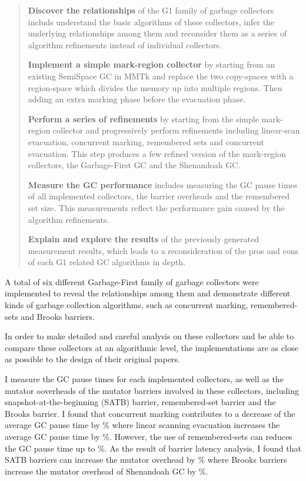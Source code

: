 \begin{quote}
  \textbf{Discover the relationships}
    of the G1 family of garbage collectors includs understand the basic algorithms
    of these collectors, infer the underlying relationships among them and reconsider them as
    a series of algorithm refinements instead of individual collectors.

  \textbf{Implement a simple mark-region collector}
    by starting from an existing SemiSpace GC in MMTk and replace the two copy-spaces
    with a region-space which divides the memory up into multiple regions.
    Then adding an extra marking phase before the evacuation phase.

  \textbf{Perform a series of refinements}
    by starting from the simple mark-region collector and progressively perform
    refinements including linear-scan evacuation, concurrent marking, remembered sets
    and concurrent evacuation. This step produces a few refined version of the
    mark-region collectors, the Garbage-First GC and the Shenandoah GC.

  \textbf{Measure the GC performance}
    includes measuring the GC pause times of all implemented collectors, the 
    barrier overheads and the remembered set size. This measurements reflect the
    performance gain caused by the algorithm refinements.

  \textbf{Explain and explore the results}
    of the previously generated measurement results, which leads to a reconsideration
    of the pros and cons of each G1 related GC algorithms in depth.
\end{quote}

A total of six different Garbage-First family of garbage collectors were implemented to reveal
the relationships among them and demonstrate different kinds of garbage collection
algorithms, such as concurrent marking, remembered-sets and Brooks barriers.

In order to make detailed and careful analysis on these collectors and
be able to compare these collectors at an algorithmic level, the implementations
are as close as possible to the design of their original papers.

I measure the GC pause times for each implemented collectors, as well as the mutator
ooverheads of the mutator barriers involved in these collectors, including
snapshot-at-the-beginning (SATB) barrier, remembered-set barrier and the Brooks barrier.
I found that concurrent marking contributes to a decrease of the average GC pause time by \%
where linear scanning evacuation increases the average GC pause time by \%.
However, the use of remembered-sets can reduces the GC pause time up to \%.
As the result of barrier latency analysis, I found that SATB barriers can
increase the mutator overhead by \% where Brooks barriers
increase the mutator overhead of Shenandoah GC by \%.

